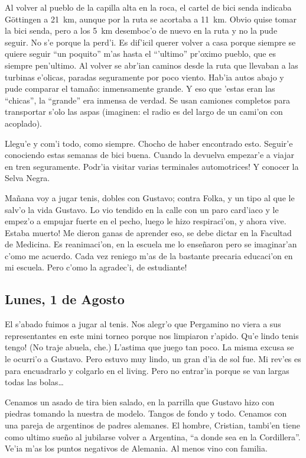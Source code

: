 Al volver al pueblo de la capilla alta en la roca, el cartel de bici senda
indicaba G\"ottingen a 21~km, aunque por la ruta se acortaba a 11~km. Obvio
quise tomar la bici senda, pero a los 5~km desemboc'o de nuevo en la ruta y no
la pude seguir. No s'e porque la perd'i. Es dif'icil querer volver a casa porque
siempre se quiere seguir ``un poquito'' m'as hasta el ``'ultimo'' pr'oximo
pueblo, que es siempre pen'ultimo. Al volver se abr'ian caminos desde la ruta
que llevaban a las turbinas e'olicas, paradas seguramente por poco viento.
Hab'ia autos abajo y pude comparar el tama\~no: inmensamente grande. Y eso que
'estas eran las ``chicas'', la ``grande'' era inmensa de verdad. Se usan
camiones completos para transportar s'olo las aspas (imaginen: el radio es del
largo de un cami'on con acoplado).

Llegu'e y com'i todo, como siempre. Chocho de haber encontrado esto. Seguir'e
conociendo estas semanas de bici buena. Cuando la devuelva empezar'e a viajar en
tren seguramente. \textexclamdown Podr'ia visitar varias terminales
automotrices! Y conocer la Selva Negra.

Ma\~nana voy a jugar tenis, dobles con Gustavo; contra Folka, y un tipo al que
le salv'o la vida Gustavo. Lo vio tendido en la calle con un paro card'iaco y le
empez'o a empujar fuerte en el pecho, luego le hizo respiraci'on, y ahora vive.
\textexclamdown Estaba muerto! Me dieron ganas de aprender eso, se debe dictar
en la Facultad de Medicina. Es reanimaci'on, en la escuela me lo ense\~naron
pero se imaginar'an c'omo me acuerdo. Cada vez reniego m'as de la bastante
precaria educaci'on en mi escuela. \textexclamdown Pero c'omo la agradec'i, de
estudiante!

\subsection*{Lunes, 1 de Agosto}

El s'abado fuimos a jugar al tenis. Nos alegr'o que Pergamino no viera a sus
representantes en este mini torneo porque nos limpiaron r'apido. \textexclamdown
Qu'e lindo tenis tengo! (No traje abuela, che.) L'astima que juego tan poco. La
misma excusa se le ocurri'o a Gustavo. Pero estuvo muy lindo, un gran d'ia de
sol fue. Mi rev'es es para encuadrarlo y colgarlo en el living. Pero no
entrar'ia porque se van largas todas las bolas\ldots

Cenamos un asado de tira bien salado, en la parrilla que Gustavo hizo con
piedras tomando la nuestra de modelo. Tangos de fondo y todo. Cenamos con una
pareja de argentinos de padres alemanes. El hombre, Cristian, tambi'en tiene
como ultimo sue\~no al jubilarse volver a Argentina, ``a donde sea en la
Cordillera''. Ve'ia m'as los puntos negativos de Alemania. Al menos vino con
familia.

